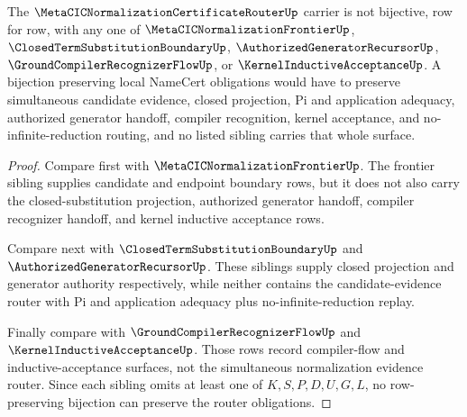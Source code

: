 \begin{theorem}
\label{thm:metacic-normalization-certificate-router-sibling-separation}
The $\MetaCICNormalizationCertificateRouterUp$ carrier is not bijective, row for row, with any one of $\MetaCICNormalizationFrontierUp$, $\ClosedTermSubstitutionBoundaryUp$, $\AuthorizedGeneratorRecursorUp$, $\GroundCompilerRecognizerFlowUp$, or $\KernelInductiveAcceptanceUp$. A bijection preserving local NameCert obligations would have to preserve simultaneous candidate evidence, closed projection, Pi and application adequacy, authorized generator handoff, compiler recognition, kernel acceptance, and no-infinite-reduction routing, and no listed sibling carries that whole surface.
\end{theorem}
\begin{proof}
Compare first with $\MetaCICNormalizationFrontierUp$. The frontier sibling supplies candidate and endpoint boundary rows, but it does not also carry the closed-substitution projection, authorized generator handoff, compiler recognizer handoff, and kernel inductive acceptance rows.

Compare next with $\ClosedTermSubstitutionBoundaryUp$ and $\AuthorizedGeneratorRecursorUp$. These siblings supply closed projection and generator authority respectively, while neither contains the candidate-evidence router with Pi and application adequacy plus no-infinite-reduction replay.

Finally compare with $\GroundCompilerRecognizerFlowUp$ and $\KernelInductiveAcceptanceUp$. Those rows record compiler-flow and inductive-acceptance surfaces, not the simultaneous normalization evidence router. Since each sibling omits at least one of $K,S,P,D,U,G,L$, no row-preserving bijection can preserve the router obligations.
\end{proof}

